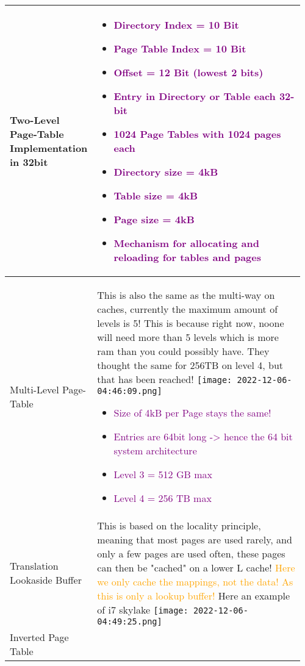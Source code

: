 \documentclass[main.tex,fontsize=8pt,paper=a4,paper=portrait,DIV=calc,]{scrartcl}
\begin{document}
\pagebreak 
\begin{table}[ht!]
\begin{tabular}{|m{0.2\linewidth}|m{0.755\linewidth}|}
\hline
Two-Level Page-Table Implementation in 32bit &
\vspace{2mm}
\begin{itemize}
\item \textcolor{purple}{Directory Index = 10 Bit}
\item \textcolor{purple}{Page Table Index = 10 Bit}
\item \textcolor{purple}{Offset = 12 Bit (lowest 2 bits)}
\item \textcolor{purple}{Entry in Directory or Table each 32-bit}
\item \textcolor{purple}{1024 Page Tables with 1024 pages each}
\item \textcolor{purple}{Directory size = 4kB}
\item \textcolor{purple}{Table size = 4kB}
\item \textcolor{purple}{Page size = 4kB}
\item \textcolor{purple}{Mechanism for allocating and reloading for tables and pages}
\vspace{-3mm}
\end{itemize} 
\\
\hline
Multi-Level Page-Table & 
This is also the same as the multi-way on caches, currently the maximum amount of levels is 5!\newline
This is because right now, noone will need more than 5 levels which is more ram than you could possibly have.\newline
They thought the same for 256TB on level 4, but that has been reached!\newline
\texttt{[image: 2022-12-06-04:46:09.png]} 
\begin{itemize}
\item \textcolor{purple}{Size of 4kB per Page stays the same!} 
\item \textcolor{purple}{Entries are 64bit long -> hence the 64 bit system architecture}
\item \textcolor{purple}{Level 3 = 512 GB max}
\item \textcolor{purple}{Level 4 = 256 TB max}
\vspace{-3mm}
\end{itemize}\\ 
\hline
Translation Lookaside Buffer & 
This is based on the locality principle, meaning that most pages are used rarely, and only a few pages are used often, these pages can then be "cached" on a lower L cache!\newline
\textcolor{orange}{Here we only cache the mappings, not the data! As this is only a lookup buffer!}\newline
Here an example of i7 skylake\newline
\texttt{[image: 2022-12-06-04:49:25.png]}\\
\hline
Inverted Page Table & 


\end{tabular}
\end{table}
\end{document}
